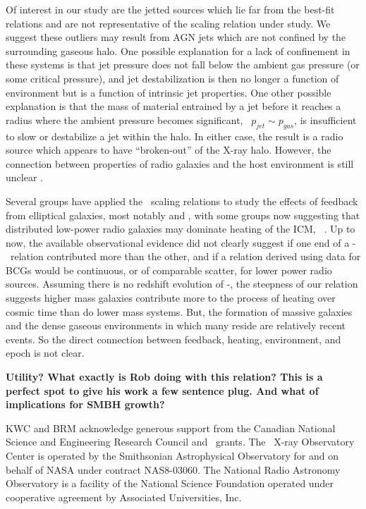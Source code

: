 \documentclass{emulateapj}
\begin{document}
Of interest in our study are the jetted sources which lie far from the
best-fit relations and are not representative of the scaling relation
under study. We suggest these outliers may result from AGN jets which
are not confined by the surrounding gaseous halo. One possible
explanation for a lack of confinement in these systems is that jet
pressure does not fall below the ambient gas pressure (or some
critical pressure), and jet destabilization is then no longer a
function of environment but is a function of intrinsic jet
properties. One other possible explanation is that the mass of
material entrained by a jet before it reaches a radius where the
ambient pressure becomes significant, \eg\ $p_{jet} \sim p_{gas}$, is
insufficient to slow or destabilize a jet within the halo. In either
case, the result is a radio source which appears to have
``broken-out'' of the X-ray halo. However, the connection between
properties of radio galaxies and the host environment is still unclear
\citep[\eg][]{2008MNRAS.386.1709C}.

Several groups have applied the \birzan\ scaling relations to study
the effects of feedback from elliptical galaxies, most notably
\citet{best07} and \citet{2007MNRAS.379..260M}, with some groups now
suggesting that distributed low-power radio galaxies may dominate
heating of the ICM, \eg\ \citet{2009arXiv0908.3158H}. Up to now, the
available observational evidence did not clearly suggest if one end of
a \pjet-\prad\ relation contributed more than the other, and if a
relation derived using data for BCGs would be continuous, or of
comparable scatter, for lower power radio sources. Assuming there is
no redshift evolution of \pjet-\prad, the steepness of our relation
suggests higher mass galaxies contribute more to the process of
heating over cosmic time than do lower mass systems. But, the
formation of massive galaxies and the dense gaseous environments in
which many reside are relatively recent events. So the direct
connection between feedback, heating, environment, and epoch is not
clear.

{\bfseries{Utility? What exactly is Rob doing with this relation? This
    is a perfect spot to give his work a few sentence plug. And what
    of implications for SMBH growth?}}

\acknowledgements

KWC and BRM acknowledge generous support from the Canadian National
Science and Engineering Research Council and \cxo\ grants. The
\chandra\ X-ray Observatory Center is operated by the Smithsonian
Astrophysical Observatory for and on behalf of NASA under contract
NAS8-03060. The National Radio Astronomy Observatory is a facility of
the National Science Foundation operated under cooperative agreement
by Associated Universities, Inc.
\end{document}
